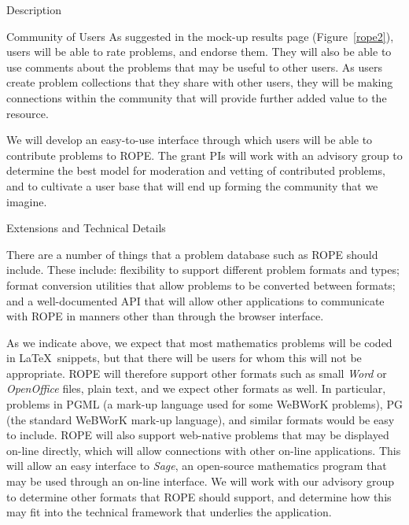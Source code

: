 \documentclass[11pt]{article}
\begin{document}
\begin{section}{Description}
\begin{subsection}{Community of Users}
As suggested in the mock-up results page (Figure~\ref{rope2}), users will
be able to rate problems, and endorse them.  They will also be
able to use comments about the problems that may be useful to other
users.  As users create problem collections that they share
with other users, they will be making connections within the community
that will provide further added value to the resource.  

We will develop an easy-to-use interface through which 
users will be able to contribute
problems to ROPE.  The grant PIs will work with an advisory group to
determine the best model for moderation and vetting of contributed
problems, and to cultivate a user base that will end up forming the
community that we imagine.

\end{subsection}

\begin{subsection}{Extensions and Technical Details}

There are a number of things that a problem database such as ROPE should
include.  These include: flexibility to support different problem formats
and types; format conversion utilities that allow problems to be converted
between formats; and a well-documented API that will allow other
applications to communicate with ROPE in manners other than through the
browser interface.

As we indicate above, we expect that most mathematics problems will be
coded in \LaTeX\ snippets, but that there will be users for whom this will
not be appropriate.  ROPE will therefore support other formats such as
small \emph{Word} or \emph{OpenOffice} files, plain text, and we expect
other formats as well.  In particular, problems in PGML (a mark-up
language used for some WeBWorK problems), PG (the standard WeBWorK mark-up
language), and similar formats would be easy to include.  ROPE will also
support web-native problems that may be displayed on-line
directly, which will allow connections with other on-line applications.
This will allow an easy interface to \emph{Sage}, an open-source
mathematics program that may be used through an on-line interface.  We
will work with our advisory group to determine other formats that ROPE
should support, and determine how this may fit into the technical
framework that underlies the application.


\end{subsection}
\end{section}
\end{document}
